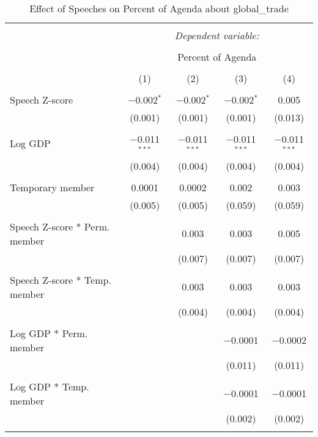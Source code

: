 
\begin{table}[!htbp] \centering 
  \caption{Effect of Speeches on Percent of Agenda about global_trade} 
  \label{} 
\begin{tabular}{@{\extracolsep{5pt}}lcccc} 
\\[-1.8ex]\hline 
\hline \\[-1.8ex] 
 & \multicolumn{4}{c}{\textit{Dependent variable:}} \\ 
\cline{2-5} 
\\[-1.8ex] & \multicolumn{4}{c}{Percent of Agenda} \\ 
\\[-1.8ex] & (1) & (2) & (3) & (4)\\ 
\hline \\[-1.8ex] 
 Speech Z-score & $-$0.002$^{*}$ & $-$0.002$^{*}$ & $-$0.002$^{*}$ & 0.005 \\ 
  & (0.001) & (0.001) & (0.001) & (0.013) \\ 
  & & & & \\ 
 Log GDP & $-$0.011$^{***}$ & $-$0.011$^{***}$ & $-$0.011$^{***}$ & $-$0.011$^{***}$ \\ 
  & (0.004) & (0.004) & (0.004) & (0.004) \\ 
  & & & & \\ 
 Temporary member & 0.0001 & 0.0002 & 0.002 & 0.003 \\ 
  & (0.005) & (0.005) & (0.059) & (0.059) \\ 
  & & & & \\ 
 Speech Z-score * Perm. member &  & 0.003 & 0.003 & 0.005 \\ 
  &  & (0.007) & (0.007) & (0.007) \\ 
  & & & & \\ 
 Speech Z-score * Temp. member &  & 0.003 & 0.003 & 0.003 \\ 
  &  & (0.004) & (0.004) & (0.004) \\ 
  & & & & \\ 
 Log GDP * Perm. member &  &  & $-$0.0001 & $-$0.0002 \\ 
  &  &  & (0.011) & (0.011) \\ 
  & & & & \\ 
 Log GDP * Temp. member &  &  & $-$0.0001 & $-$0.0001 \\ 
  &  &  & (0.002) & (0.002) \\ 
  & & & & \\ 

\end{tabular}
\end{table}
